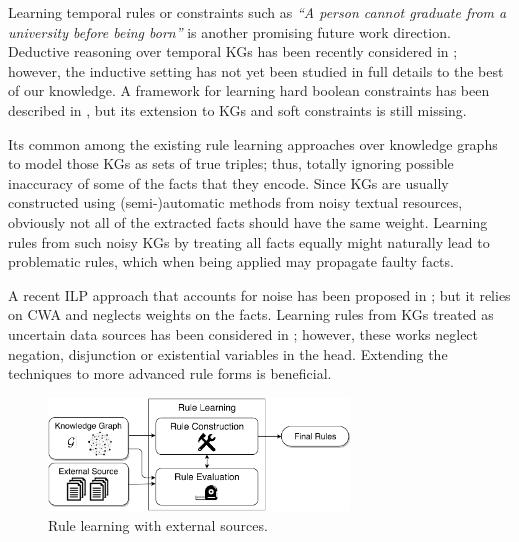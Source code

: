 Learning temporal rules or constraints such as \emph{``A person cannot graduate from a university before being born''} is another promising future work direction. Deductive reasoning over temporal KGs has been recently considered in \cite{DBLP:conf/aaai/ChekolPSS17}; however, the inductive setting has not yet been studied in full details to the best of our knowledge. A framework for learning hard boolean constraints has been described in \cite{DBLP:conf/aaai/RaedtPT18}, but its extension to KGs and soft constraints is still missing. 

Its common among the existing rule learning approaches over knowledge graphs to model those KGs as sets of true triples; thus, totally ignoring possible inaccuracy of some of the facts that they encode. Since KGs are usually %
constructed using (semi-)automatic methods from noisy textual resources, obviously not all of the extracted facts should have the same weight. Learning rules from such noisy KGs by treating all facts equally might naturally lead to problematic rules, which when being applied may propagate faulty facts. %

A recent ILP approach that accounts for noise has been proposed in \cite{sigmailp}; but it relies on CWA and neglects weights on the facts.
Learning rules from KGs treated as uncertain data sources has  been considered in \cite{probfoil,DBLP:conf/ijcai/RaedtDTBV15,DBLP:conf/clima/CorapiSIR11}; however, these works neglect negation, disjunction or existential variables in the head. %
Extending the techniques to more advanced rule forms is beneficial. %


\begin{figure}[t]
\centering
\includegraphics[width=8cm]{figures/discussion_overview}
\caption{Rule learning with external sources.}
\label{fig:discussion_overview}
\end{figure}


